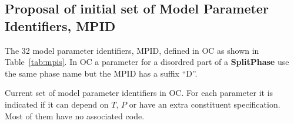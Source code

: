 \documentclass{article}
\begin{document}
\begin{appendices}
\newpage
\section{Proposal of initial set of Model Parameter Identifiers, MPID}\label{sec:mpid2}

The 32 model parameter identifiers, MPID, defined in OC as shown in
Table~\ref{tab:mpis}.  In OC a parameter for a disordred part of a
{\bf SplitPhase} use the same phase name but the MPID has a suffix
``D''.

\begin{table}[!h]
  \caption{Current set of model parameter identifiers in OC.  For each
    parameter it is indicated if it can depend on $T$, $P$ or have an
    extra constituent specification.  Most of them have no associated
    code.}\label{tab:mpis}


\end{table}
\end{appendices}
\end{document}

